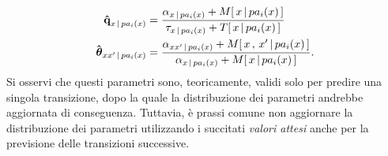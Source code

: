 \begin{equation}
\label{eq:ctbn-imaginary-params}
\begin{split}
\paramhat{q}_{x\,\arrowvert\,pa_i(\setel{x})}&=\frac{\alpha_{\setel{x}\,\arrowvert\,pa_i(\setel{x})} + \mstat{x\,\arrowvert\,pa_i(\setel{x})}}{\tau_{\setel{x}\,\arrowvert\,pa_i(\setel{x})} + \tstat{x\,\arrowvert\,pa_i(\setel{x})}} \\
\greekhat{\theta}_{xx^\prime\,\arrowvert\,pa_i(\setel{x})}&=\frac{\alpha_{\setel{x}\setel{x}^{\prime}\,\arrowvert\,pa_i(\setel{x})}+\mstat[x]{x^\prime\,\arrowvert\,pa_i(\setel{x})}}{\alpha_{\setel{x}\,\arrowvert\,pa_i(\setel{x})} + \mstat{x\,\arrowvert\,pa_i(\setel{x})}}\text{.}
\end{split}
\end{equation}
Si osservi che questi parametri sono, teoricamente, validi solo per predire una singola transizione, dopo la quale la distribuzione dei parametri andrebbe aggiornata di conseguenza. Tuttavia, è prassi comune non aggiornare la distribuzione dei parametri utilizzando i succitati \emph{valori attesi} anche per la previsione delle transizioni successive.
